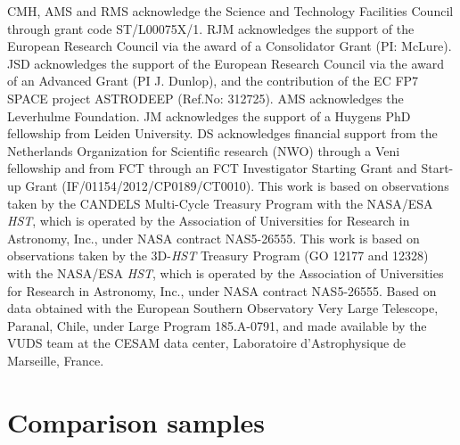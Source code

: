 \documentclass[fleqn,usenatbib]{mn2e}
\begin{document}
CMH, AMS and RMS acknowledge the Science and Technology Facilities Council through grant code ST/L00075X/1.
RJM acknowledges the support of the European Research Council via the award of a Consolidator Grant (PI: McLure).
JSD acknowledges the support of the European Research Council via the award of an Advanced Grant (PI J. Dunlop), and the contribution of the EC FP7 SPACE project ASTRODEEP (Ref.No: 312725).
AMS acknowledges the Leverhulme Foundation.
JM acknowledges the support of a Huygens PhD fellowship from Leiden University. DS acknowledges financial support from the Netherlands Organization for Scientific research (NWO) through a Veni fellowship and from FCT through an FCT Investigator Starting Grant and Start-up Grant (IF/01154/2012/CP0189/CT0010).
This work is based on observations taken by the CANDELS Multi-Cycle Treasury Program with the NASA/ESA {\em HST}, which is operated by the Association of Universities for Research in Astronomy, Inc., under NASA contract NAS5-26555.
This work is based on observations taken by the 3D-{\em HST} Treasury Program (GO 12177 and 12328) with the NASA/ESA {\em HST}, which is operated by the Association of Universities for Research in Astronomy, Inc., under NASA contract NAS5-26555.
Based on data obtained with the European Southern Observatory Very Large Telescope, Paranal, Chile, under Large Program 185.A-0791, and made available by the VUDS team at the CESAM data center, Laboratoire d'Astrophysique de Marseille, France.




%


\clearpage 

%

\clearpage



\appendix

\section{Comparison samples}\label{app:comparison_samples}
\end{document}

